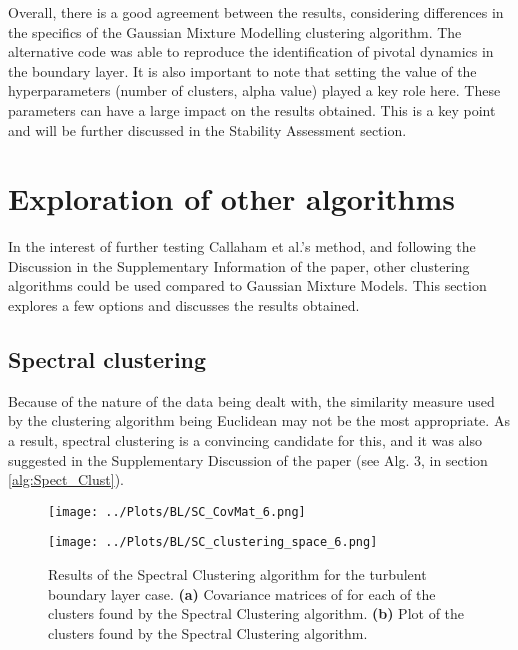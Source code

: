 \documentclass[12pt]{report} %
\begin{document}
Overall, there is a good agreement between the results, considering differences in the specifics of the Gaussian Mixture Modelling clustering algorithm. The alternative code was able to reproduce the identification of pivotal dynamics in the boundary layer. It is also important to note that setting the value of the hyperparameters (number of clusters, alpha value) played a key role here. These parameters can have a large impact on the results obtained. This is a key point and will be further discussed in the Stability Assessment section.

\newpage

\section{Exploration of other algorithms}

In the interest of further testing Callaham et al.’s method, and following the Discussion in the Supplementary Information of the paper\cite{callaham2021learning}, other clustering algorithms could be used compared to Gaussian Mixture Models. This section explores a few options and discusses the results obtained.

\subsection{Spectral clustering}

Because of the nature of the data being dealt with, the similarity measure used by the clustering algorithm being Euclidean may not be the most appropriate\cite{luxburg2007tutorial}. As a result, spectral clustering is a convincing candidate for this, and it was also suggested in the Supplementary Discussion of the paper\cite[Supplementary Information]{callaham2021learning} (see Alg. 3, in section \ref{alg:Spect_Clust}).


\begin{figure}[htbp]
  \centering
  \begin{minipage}{0.9\textwidth}
    \centering
    \texttt{[image: ../Plots/BL/SC\_CovMat\_6.png]}
    \subcaption{}
  \end{minipage}

  \begin{minipage}{0.8\textwidth}
    \centering
    \texttt{[image: ../Plots/BL/SC\_clustering\_space\_6.png]}
    \subcaption{}
  \end{minipage}

  \caption{Results of the Spectral Clustering algorithm for the turbulent boundary layer case. \textbf{(a)} Covariance matrices of for each of the clusters found by the Spectral Clustering algorithm. \textbf{(b)} Plot of the clusters found by the Spectral Clustering algorithm.}
  \label{fig:SC_results_1}
\end{figure}
\end{document}
